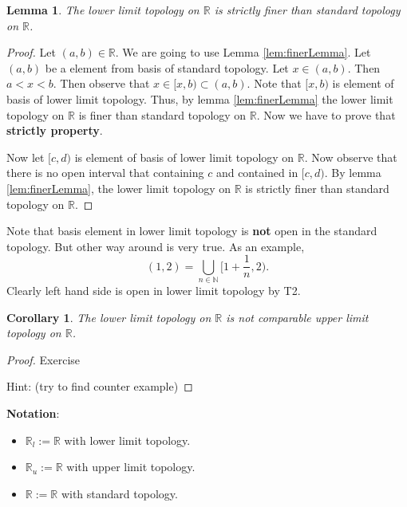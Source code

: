 \documentclass[
]{book}
\providecommand{\tightlist}{%
  \setlength{\itemsep}{0pt}\setlength{\parskip}{0pt}}
\newtheorem{lemma}{Lemma}[chapter]
\newtheorem{corollary}{Corollary}[chapter]
\theoremstyle{definition}
\theoremstyle{definition}
\theoremstyle{definition}
\theoremstyle{definition}
\theoremstyle{remark}
\begin{document}
\begin{lemma}
\protect\hypertarget{lem:unnamed-chunk-26}{}\label{lem:unnamed-chunk-26}The lower limit topology on \(\mathbb{R}\) is strictly finer than standard topology on \(\mathbb{R}\).
\end{lemma}

\begin{proof}
Let \((a,b)\in \mathbb{R}\). We are going to use Lemma \ref{lem:finerLemma}. Let \((a,b)\) be a element from basis of standard topology. Let \(x\in (a,b)\). Then \(a<x<b\). Then observe that \(x\in [x,b)\subset (a,b)\). Note that \([x,b)\) is element of basis of lower limit topology. Thus, by lemma \ref{lem:finerLemma} the lower limit topology on \(\mathbb{R}\) is finer than standard topology on \(\mathbb{R}\). Now we have to prove that \textbf{strictly property}.

Now let \([c,d)\) is element of basis of lower limit topology on \(\mathbb{R}\). Now observe that there is no open interval that containing \(c\) and contained in \([c,d)\). By lemma \ref{lem:finerLemma}, the lower limit topology on \(\mathbb{R}\) is strictly finer than standard topology on \(\mathbb{R}\).
\end{proof}

Note that basis element in lower limit topology is \textbf{not} open in the standard topology. But other way around is very true. As an example, \[(1,2)=\bigcup_{n\in \mathbb{N}}[1+\frac{1}{n},2).\] Clearly left hand side is open in lower limit topology by T2.

\begin{corollary}
\protect\hypertarget{cor:unnamed-chunk-28}{}\label{cor:unnamed-chunk-28}The lower limit topology on \(\mathbb{R}\) is not comparable upper limit topology on \(\mathbb{R}\).
\end{corollary}

\begin{proof}
Exercise

Hint: (try to find counter example)
\end{proof}

\textbf{Notation}:

\begin{itemize}
\tightlist
\item
  \(\mathbb{R}_l:=\mathbb{R}\) with lower limit topology.
\item
  \(\mathbb{R}_u:=\mathbb{R}\) with upper limit topology.
\item
  \(\mathbb{R}:=\mathbb{R}\) with standard topology.
\end{itemize}
\end{document}
